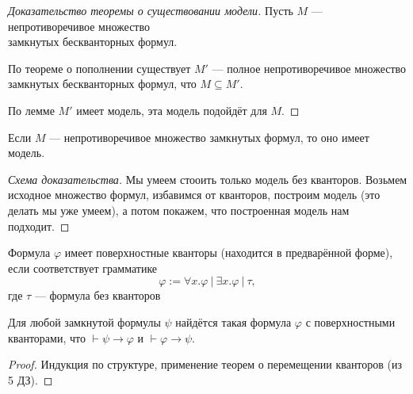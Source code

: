 \begin{proof}[Доказательство теоремы о существовании модели]
Пусть $M$ --- непротиворечивое множество\\ замкнутых бескванторных формул.

По теореме о пополнении существует $M'$ --- полное непротиворечивое множество замкнутых бескванторных формул,
что $M \subseteq M'$.

По лемме $M'$ имеет модель, эта модель подойдёт для $M$.
\end{proof}

\begin{theorem}
Если $M$ --- непротиворечивое множество замкнутых формул, то оно имеет модель.
\end{theorem}
\begin{proof}[Схема доказательства] Мы умеем стооить только модель без кванторов. Возьмем исходное множество формул, избавимся от кванторов, построим модель (это делать мы уже умеем), а потом покажем, что построенная модель нам подходит.

\end{proof}

\begin{definition}
    Формула $\varphi$ имеет поверхностные кванторы (находится в предварённой форме), если
соответствует грамматике
\[\varphi := \forall x.\varphi\ |\ \exists x.\varphi\ |\ \tau, \]
где $\tau$ --- формула без кванторов
\end{definition}

\begin{theorem}
    Для любой замкнутой формулы $\psi$ найдётся такая формула $\varphi$ с поверхностными кванторами,
что $\vdash \psi\to\varphi$ и $\vdash\varphi\to\psi$.
\end{theorem}
\begin{proof}Индукция по структуре, применение теорем о перемещении кванторов (из 5 ДЗ).
\end{proof}

